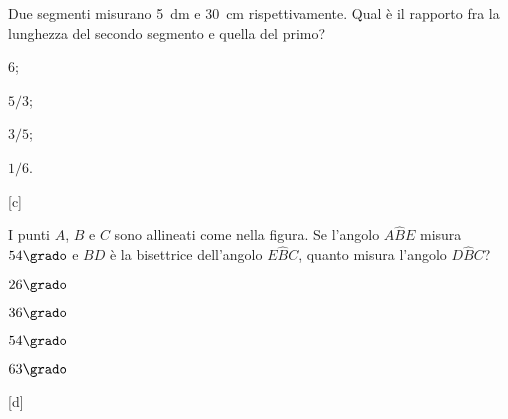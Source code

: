 
\begin{esercizio}
\label{ese:1.131}
Due segmenti misurano 5~dm e 30~cm rispettivamente. Qual è il 
rapporto fra la lunghezza del secondo segmento e quella del primo?
\begin{multicols}{4}
\begin{enumeratea}
\item 6;
\item \(5/3\);
\item \(3/5\);
\item \(1/6\).
\end{enumeratea}
\end{multicols}
\vspace{-2.3em}
\hfill[c]
\end{esercizio}

\begin{esercizio}
\label{ese:1.132}
I punti \(A\), \(B\) e \(C\) sono allineati come nella 
figura. Se l'angolo \(A\widehat{B}E\) misura 
\(54\grado\) e \(BD\) è la bisettrice dell'angolo \(E\widehat{B}C\), quanto 
misura l'angolo \(D\widehat{B}C\)?

\begin{minipage}{.39 \textwidth}
\begin{center}
\begin{inaccessibleblock}
 
\end{inaccessibleblock}
\end{center}
\end{minipage}
\hfill
\begin{minipage}{.55 \textwidth}
\begin{multicols}{2}
\begin{enumeratea}
\item \(26\grado\)
\item \(36\grado\)
\item \(54\grado\)
\item \(63\grado\)
\end{enumeratea}
\end{multicols}
\vspace{-2.3em}
\hfill[d]
\end{minipage}

\end{esercizio}

